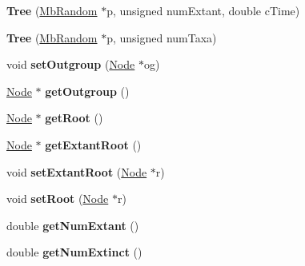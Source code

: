 \begin{DoxyCompactItemize}
\item 
\mbox{\label{class_tree_a1c13cc2e86efe61ad51f0e031fedacf0}} 
{\bfseries Tree} (\mbox{\hyperlink{class_mb_random}{Mb\+Random}} $\ast$p, unsigned num\+Extant, double c\+Time)
\item 
\mbox{\label{class_tree_a984b42b862522bdcc5ace09d3d99254c}} 
{\bfseries Tree} (\mbox{\hyperlink{class_mb_random}{Mb\+Random}} $\ast$p, unsigned num\+Taxa)
\item 
\mbox{\label{class_tree_a94691772f16f53dc4664836448b7a535}} 
void {\bfseries set\+Outgroup} (\mbox{\hyperlink{class_node}{Node}} $\ast$og)
\item 
\mbox{\label{class_tree_a1a2caefc4f191ab60bcd0dd5d8a345fb}} 
\mbox{\hyperlink{class_node}{Node}} $\ast$ {\bfseries get\+Outgroup} ()
\item 
\mbox{\label{class_tree_a34ace6b8eb8a67d8246ece6a04bf6344}} 
\mbox{\hyperlink{class_node}{Node}} $\ast$ {\bfseries get\+Root} ()
\item 
\mbox{\label{class_tree_ad522924b6683bf5df5bc4e38235b7ad1}} 
\mbox{\hyperlink{class_node}{Node}} $\ast$ {\bfseries get\+Extant\+Root} ()
\item 
\mbox{\label{class_tree_ab15227cfa1e31e0c3d7ae1e0de6f0856}} 
void {\bfseries set\+Extant\+Root} (\mbox{\hyperlink{class_node}{Node}} $\ast$r)
\item 
\mbox{\label{class_tree_af4e1e6762ea92763e46f15f3233869f7}} 
void {\bfseries set\+Root} (\mbox{\hyperlink{class_node}{Node}} $\ast$r)
\item 
\mbox{\label{class_tree_a0b0b609ae1b9fdbd480ed2f724e5286c}} 
double {\bfseries get\+Num\+Extant} ()
\item 
\mbox{\label{class_tree_a5f7d67f4724184e4724516887d34ff29}} 
double {\bfseries get\+Num\+Extinct} ()
\item 
\mbox{\label{class_tree_a96eca8b854f3cc0ad60562961df0d411}} 

\end{DoxyCompactItemize}
